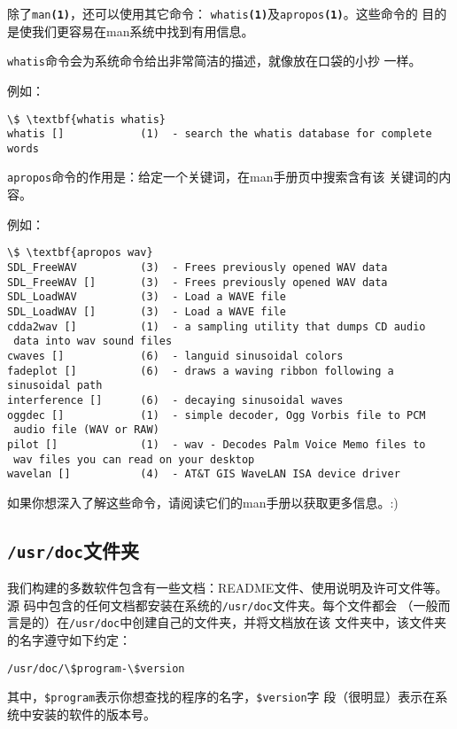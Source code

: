 除了\texttt{man\textbf{(1)}}，还可以使用其它命令：
\texttt{whatis\textbf{(1)}}及\texttt{apropos\textbf{(1)}}。这些命令的
目的是使我们更容易在man系统中找到有用信息。

\texttt{whatis}命令会为系统命令给出非常简洁的描述，就像放在口袋的小抄
一样。

例如：
\begin{Verbatim}[frame=single, commandchars=\\\{\}]
\$ \textbf{whatis whatis}
whatis []            (1)  - search the whatis database for complete words
\end{Verbatim}

\texttt{apropos}命令的作用是：给定一个关键词，在man手册页中搜索含有该
关键词的内容。

例如：
\begin{Verbatim}[frame=single, commandchars=\\\{\}]
\$ \textbf{apropos wav}
SDL_FreeWAV          (3)  - Frees previously opened WAV data
SDL_FreeWAV []       (3)  - Frees previously opened WAV data
SDL_LoadWAV          (3)  - Load a WAVE file
SDL_LoadWAV []       (3)  - Load a WAVE file
cdda2wav []          (1)  - a sampling utility that dumps CD audio
 data into wav sound files
cwaves []            (6)  - languid sinusoidal colors
fadeplot []          (6)  - draws a waving ribbon following a sinusoidal path
interference []      (6)  - decaying sinusoidal waves
oggdec []            (1)  - simple decoder, Ogg Vorbis file to PCM
 audio file (WAV or RAW)
pilot []             (1)  - wav - Decodes Palm Voice Memo files to
 wav files you can read on your desktop
wavelan []           (4)  - AT&T GIS WaveLAN ISA device driver
\end{Verbatim}
如果你想深入了解这些命令，请阅读它们的man手册以获取更多信息。:)

\subsection{\texttt{/usr/doc}文件夹}
\label{sec:help:systemhelp:usrDoc}

我们构建的多数软件包含有一些文档：README文件、使用说明及许可文件等。源
码中包含的任何文档都安装在系统的\texttt{/usr/doc}文件夹。每个文件都会
（一般而言是的）在\texttt{/usr/doc}中创建自己的文件夹，并将文档放在该
文件夹中，该文件夹的名字遵守如下约定：
\begin{Verbatim}[frame=single, commandchars=\\\{\}]
/usr/doc/\$program-\$version
\end{Verbatim}
其中，\texttt{\$program}表示你想查找的程序的名字，\texttt{\$version}字
段（很明显）表示在系统中安装的软件的版本号。

